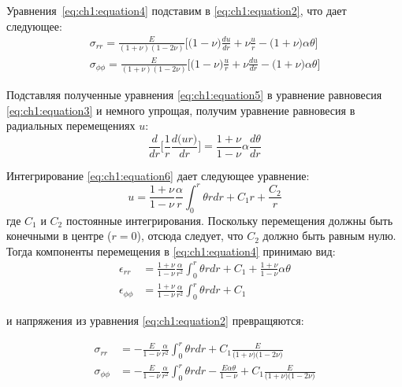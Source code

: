 Уравнения~\cref{eq:ch1:equation4} подставим в \cref{eq:ch1:equation2}, что дает следующее:
\begin{equation}
	\label{eq:ch1:equation5}
	\begin{split}
		\sigma_{rr} = \frac{E}{(1+\nu)(1-2\nu)} \big[\big(1-\nu \big)\frac{du}{dr} + \nu\frac{u}{r} - \big(1+\nu\big )\alpha\theta\big] \\
		\sigma_{\phi\phi} = \frac{E}{(1+\nu)(1-2\nu)} \big[\big(1-\nu \big)\frac{u}{r} + \nu\frac{du}{dr} - \big(1+\nu\big )\alpha\theta\big] 
	\end{split}
\end{equation}

Подставляя полученные уравнения \cref{eq:ch1:equation5} в уравнение равновесия \cref{eq:ch1:equation3} и немного упрощая, получим уравнение равновесия в радиальных перемещениях \(u\):
\begin{equation}
	\label{eq:ch1:equation6}
	\frac {d}{dr} \big[\frac{1}{r} \frac{d \big(ur \big)}{dr} \big] = \frac{1+\nu}{1-\nu}\alpha\frac{d\theta}{dr}
\end{equation}

Интегрирование \cref{eq:ch1:equation6} дает следующее уравнение:
\begin{equation}
	\label{eq:ch1:equation7}
	u = \frac{1+\nu}{1-\nu} \frac{\alpha}{r} \int_0^r \theta rdr +C_1r +\frac{C_2}{r}
\end{equation}
где \(C_1\) и \(C_2\) постоянные интегрирования. Поскольку перемещения должны быть конечными в центре (\(r=0\)), отсюда следует, что \(C_2\) должно быть равным нулю. Тогда компоненты перемещения в \cref{eq:ch1:equation4} принимаю вид:
\begin{equation}
	\label{eq:ch1:equation8}
	\begin{split}
		\epsilon_{rr} &= \frac{1+\nu}{1-\nu} \frac{\alpha}{r^2} \int_0^r \theta rdr +C_1 + \frac{1+\nu}{1-\nu} \alpha\theta\\
		\epsilon_{\phi\phi} &= \frac{1+\nu}{1-\nu} \frac{\alpha}{r^2} \int_0^r \theta rdr +C_1
	\end{split}
\end{equation}

и напряжения из уравнения \cref{eq:ch1:equation2} превращяются:

\begin{equation}
	\label{eq:ch1:equation9}
	\begin{split}
		\sigma_{rr} &= -\frac{E}{1-\nu} \frac{\alpha}{r^2} \int_0^r \theta rdr +C_1 \frac{E}{\big(1+\nu\big)\big(1-2\nu\big)}\\
		\sigma_{\phi\phi} &= -\frac{E}{1-\nu} \frac{\alpha}{r^2} \int_0^r \theta rdr -\frac{E \alpha \theta}{1-\nu} +C_1\frac{E}{\big(1+\nu\big)\big(1-2\nu\big)}
	\end{split}
\end{equation}

